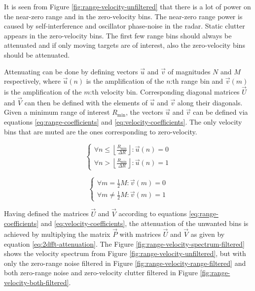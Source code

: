 It is seen from Figure \ref{fig:range-velocity-unfiltered} that there is a lot of power on the near-zero range and in the zero-velocity bins.
The near-zero range power is caused by self-interference and oscillator phase-noise in the radar.
Static clutter appears in the zero-velocity bins.
The first few range bins should always be attenuated and if only moving targets are of interest,
also the zero-velocity bins should be attenuated.

Attenuating can be done by defining vectors $\vec{u}$ and $\vec{v}$ of magnitudes $N$ and $M$ respectively,
where $\vec{u}(n)$ is the amplification of the $n$:th range bin
and $\vec{v}(m)$ is the amplification of the $m$:th velocity bin.
Corresponding diagonal matrices $\vec{U}$ and $\vec{V}$ can then be defined with the elements
of $\vec{u}$ and $\vec{v}$ along their diagonals.
Given a minimum range of interest $R_{\mathrm{min}}$,
the vectors $\vec{u}$ and $\vec{v}$ can be defined via equations
\ref{eq:range-coefficients} and \ref{eq:velocity-coefficients}.
The only velocity bins that are muted are the ones corresponding to zero-velocity.

\begin{equation}
\label{eq:range-coefficients}
    \begin{cases}
        \forall n \leq \left \lfloor \frac{ R_{\mathrm{min}} }{ \Delta R } \right \rfloor :
            \vec{u}(n) = 0 \\
        \forall n > \left \lfloor \frac{ R_{\mathrm{min}} }{ \Delta R } \right \rfloor :
            \vec{u}(n) = 1
    \end{cases}
\end{equation}

\begin{equation}
\label{eq:velocity-coefficients}
    \begin{cases}
        \forall m = \frac{1}{2}M :
            \vec{v}(m) = 0 \\
        \forall m \neq \frac{1}{2}M :
            \vec{v}(m) = 1
    \end{cases}
\end{equation}

Having defined the matrices $\vec{U}$ and $\vec{V}$ according to equations
\ref{eq:range-coefficients} and \ref{eq:velocity-coefficients},
the attenuation of the unwanted bins is achieved by multiplying the matrix
$\vec{P}$ with matrices $\vec{U}$ and $\vec{V}$ as given by equation \ref{eq:2dfft-attenuation}.
The Figure \ref{fig:range-velocity-spectrum-filtered} shows the velocity spectrum 
from Figure \ref{fig:range-velocity-unfiltered}, but with only the zero-range noise filtered 
in Figure \ref{fig:range-velocity-range-filtered} and both zero-range noise and zero-velocity clutter
filtered in Figure \ref{fig:range-velocity-both-filtered}.

